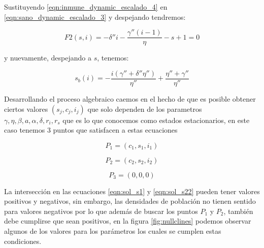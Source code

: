 \documentclass{article}
\begin{document}
Sustituyendo \ref{eqn:inmune_dynamic_escalado_4} en \ref{eqn:sano_dynamic_escalado_3} y despejando tendremos:

\begin{equation}
    F2(s,i) = -\delta''  i-\frac{\gamma''  (i-1)}{\eta }-s+1 = 0
    \label{eqn:sol_s22}
\end{equation}

y nuevamente, despejando a $s$, tenemos:

\begin{equation}
    s_b(i) = -\frac{i (\gamma'' +\delta''  \eta'' )}{\eta'' }+\frac{\eta'' +\gamma''  }{\eta'' }
    \label{eqn:sol_s2}
\end{equation}


Desarrollando el proceso algebraico caemos en el hecho de que es posible obtener ciertos valores $(s_j,c_j,i_j)$ que solo dependen de los parametros $\gamma,\eta,\beta,a,\alpha,\delta, r_i,r_s$ que es lo que conocemos como estados estacionarios, en este caso tenemos 3 puntos que satisfacen a estas ecuaciones

\begin{equation}
   P_1 = (c_1, s_1, i_1)    
\end{equation}

\begin{equation}
    P_2 = (c_2, s_2, i_2)
\end{equation}

\begin{equation}
    P_3 = (0, 0, 0)
\end{equation}

La intersección en las ecuaciones \ref{eqn:sol_s1} y \ref{eqn:sol_s22} pueden tener valores positivos y negativos, sin embargo, las densidades de población no tienen sentido para valores negativos por lo que además de buscar los puntos $P_1$ y $P_2$, también debe cumplirse que sean positivos, en la figura \ref{fig:nullclines} podemos observar algunos de los valores para los parámetros los cuales se cumplen estas condiciones.
\end{document}
